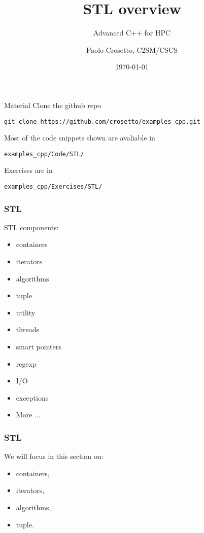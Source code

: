 \documentclass[aspectratio=43]{beamer}
\author{Paolo Crosetto, C2SM/CSCS}
\title{STL overview}
\subtitle{Advanced C++ for HPC}
\date{\today}
\begin{document}
\cscstitle



\begin{frame}[fragile]{Material}
  Clone the github repo
\begin{verbatim}
git clone https://github.com/crosetto/examples_cpp.git
\end{verbatim}
  Most of the code snippets shown are avaliable in
\begin{verbatim}
examples_cpp/Code/STL/
\end{verbatim}
  Exercises are in
\begin{verbatim}
examples_cpp/Exercises/STL/
\end{verbatim}
\end{frame}

\begin{frame}[fragile]\frametitle{STL}
  STL components:
  \begin{itemize}
  \item containers
  \item iterators
  \item algorithms
  \item tuple
  \item utility
  \item threads
  \item smart pointers
  \item regexp
  \item I/O
  \item exceptions
  \item More ...
  \end{itemize}
\end{frame}

\begin{frame}[fragile]\frametitle{STL}
  We will focus in this section on:
  \begin{itemize}
  \item containers,
  \item iterators,
  \item algorithms,
  \item tuple.
  \end{itemize}
\end{frame}
\end{document}
